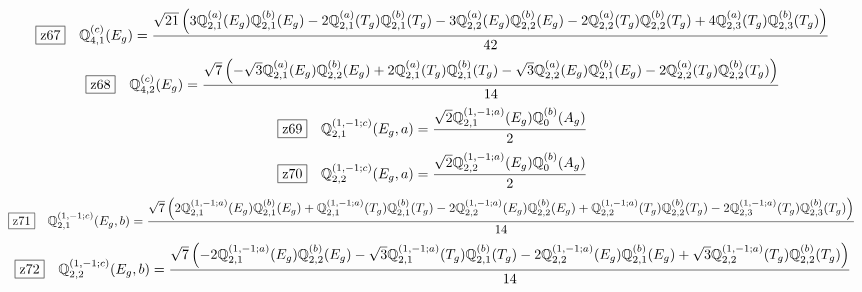 \documentclass[fleqn,10pt,landscape]{jsarticle}
\begin{document}
\begin{dmath*}
\hspace*{3mm}\fbox{z67}\quad \mathbb{Q}_{4,1}^{(c)}(E_{g})=\frac{\sqrt{21} \left(3 \mathbb{Q}_{2,1}^{(a)}(E_{g}) \mathbb{Q}_{2,1}^{(b)}(E_{g}) - 2 \mathbb{Q}_{2,1}^{(a)}(T_{g}) \mathbb{Q}_{2,1}^{(b)}(T_{g}) - 3 \mathbb{Q}_{2,2}^{(a)}(E_{g}) \mathbb{Q}_{2,2}^{(b)}(E_{g}) - 2 \mathbb{Q}_{2,2}^{(a)}(T_{g}) \mathbb{Q}_{2,2}^{(b)}(T_{g}) + 4 \mathbb{Q}_{2,3}^{(a)}(T_{g}) \mathbb{Q}_{2,3}^{(b)}(T_{g})\right)}{42}
\end{dmath*}
\begin{dmath*}
\hspace*{3mm}\fbox{z68}\quad \mathbb{Q}_{4,2}^{(c)}(E_{g})=\frac{\sqrt{7} \left(- \sqrt{3} \mathbb{Q}_{2,1}^{(a)}(E_{g}) \mathbb{Q}_{2,2}^{(b)}(E_{g}) + 2 \mathbb{Q}_{2,1}^{(a)}(T_{g}) \mathbb{Q}_{2,1}^{(b)}(T_{g}) - \sqrt{3} \mathbb{Q}_{2,2}^{(a)}(E_{g}) \mathbb{Q}_{2,1}^{(b)}(E_{g}) - 2 \mathbb{Q}_{2,2}^{(a)}(T_{g}) \mathbb{Q}_{2,2}^{(b)}(T_{g})\right)}{14}
\end{dmath*}
\begin{dmath*}
\hspace*{3mm}\fbox{z69}\quad \mathbb{Q}_{2,1}^{(1,-1;c)}(E_{g},a)=\frac{\sqrt{2} \mathbb{Q}_{2,1}^{(1,-1;a)}(E_{g}) \mathbb{Q}_{0}^{(b)}(A_{g})}{2}
\end{dmath*}
\begin{dmath*}
\hspace*{3mm}\fbox{z70}\quad \mathbb{Q}_{2,2}^{(1,-1;c)}(E_{g},a)=\frac{\sqrt{2} \mathbb{Q}_{2,2}^{(1,-1;a)}(E_{g}) \mathbb{Q}_{0}^{(b)}(A_{g})}{2}
\end{dmath*}
\begin{dmath*}
\hspace*{3mm}\fbox{z71}\quad \mathbb{Q}_{2,1}^{(1,-1;c)}(E_{g},b)=\frac{\sqrt{7} \left(2 \mathbb{Q}_{2,1}^{(1,-1;a)}(E_{g}) \mathbb{Q}_{2,1}^{(b)}(E_{g}) + \mathbb{Q}_{2,1}^{(1,-1;a)}(T_{g}) \mathbb{Q}_{2,1}^{(b)}(T_{g}) - 2 \mathbb{Q}_{2,2}^{(1,-1;a)}(E_{g}) \mathbb{Q}_{2,2}^{(b)}(E_{g}) + \mathbb{Q}_{2,2}^{(1,-1;a)}(T_{g}) \mathbb{Q}_{2,2}^{(b)}(T_{g}) - 2 \mathbb{Q}_{2,3}^{(1,-1;a)}(T_{g}) \mathbb{Q}_{2,3}^{(b)}(T_{g})\right)}{14}
\end{dmath*}
\begin{dmath*}
\hspace*{3mm}\fbox{z72}\quad \mathbb{Q}_{2,2}^{(1,-1;c)}(E_{g},b)=\frac{\sqrt{7} \left(- 2 \mathbb{Q}_{2,1}^{(1,-1;a)}(E_{g}) \mathbb{Q}_{2,2}^{(b)}(E_{g}) - \sqrt{3} \mathbb{Q}_{2,1}^{(1,-1;a)}(T_{g}) \mathbb{Q}_{2,1}^{(b)}(T_{g}) - 2 \mathbb{Q}_{2,2}^{(1,-1;a)}(E_{g}) \mathbb{Q}_{2,1}^{(b)}(E_{g}) + \sqrt{3} \mathbb{Q}_{2,2}^{(1,-1;a)}(T_{g}) \mathbb{Q}_{2,2}^{(b)}(T_{g})\right)}{14}
\end{dmath*}
\end{document}
